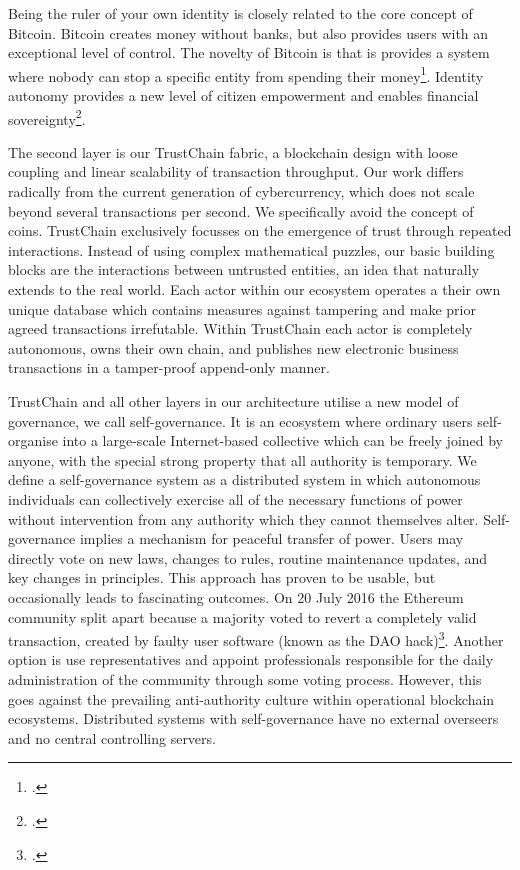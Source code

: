 \documentclass[USenglish]{article}
\begin{document}
Being the ruler of your own identity is closely related to the core concept of Bitcoin.
Bitcoin creates money without banks, but also provides users with an exceptional level of control.
The novelty of Bitcoin is that is provides a system where nobody can stop a specific entity from spending their money\footcite{r3corda}.
Identity autonomy provides a new level of citizen empowerment and enables financial sovereignty\footcite{matouk2009financial}.

The second layer is our TrustChain fabric, a blockchain design with loose coupling and linear scalability of transaction throughput. 
Our work differs radically from the current generation of cybercurrency, which does not scale beyond several transactions per second. 
We specifically avoid the concept of coins.
TrustChain exclusively focusses on the emergence of trust through repeated interactions.
Instead of using complex mathematical puzzles, our basic building blocks are the interactions between untrusted entities, an idea that naturally extends to the real world.
Each actor within our ecosystem operates a their own unique database which contains measures against tampering and make prior agreed transactions irrefutable.
Within TrustChain each actor is completely autonomous, owns their own chain, and publishes new electronic business transactions in a tamper-proof append-only manner.

TrustChain and all other layers in our architecture utilise a new model of governance, we call self-governance.
It is an ecosystem where ordinary users self-organise into a large-scale Internet-based collective which can be freely joined by anyone, with the special strong property that all authority is temporary.
We define a self-governance system as a distributed system in which autonomous individuals can collectively exercise all of the necessary functions of power without intervention from any authority which they cannot themselves alter.
Self-governance implies a mechanism for peaceful transfer of power. 
Users may directly vote on new laws, changes to rules, routine maintenance updates, and key changes in principles. 
This approach has proven to be usable, but occasionally leads to fascinating outcomes.
On 20 July 2016 the Ethereum community split apart because a majority voted to revert a completely valid transaction, created by faulty user software (known as the DAO hack)\footcite{cryptocomparedao}.
Another option is use representatives and appoint professionals responsible for the daily administration of the community through some voting process.
However, this goes against the prevailing anti-authority culture within operational blockchain ecosystems.
Distributed systems with self-governance have no external overseers and no central controlling servers.
\end{document}
